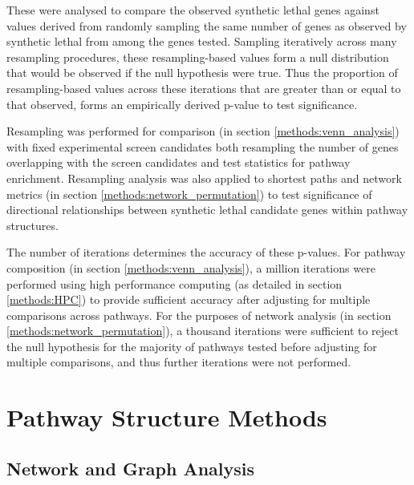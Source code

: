 These were analysed to compare the observed synthetic lethal genes against values derived from randomly sampling the same number of genes as observed by synthetic lethal from among the genes tested. Sampling iteratively across many resampling procedures, these resampling-based values form a null distribution that would be observed if the null hypothesis were true. Thus the proportion of resampling-based values across these iterations that are greater than or equal to that observed, forms an empirically derived p-value to test significance.

Resampling was performed for comparison (in section \ref{methods:venn_analysis}) with fixed experimental screen candidates \citep{Telford2015} both resampling the number of genes overlapping with the screen candidates and test statistics for pathway enrichment. Resampling analysis was also applied to shortest paths and network metrics (in section \ref{methods:network_permutation}) to test significance of directional relationships between synthetic lethal candidate genes within pathway structures.

The number of iterations determines the accuracy of these p-values. For pathway composition (in section \ref{methods:venn_analysis}), a million iterations were performed using high performance computing (as detailed in section \ref{methods:HPC}) to provide sufficient accuracy after adjusting for multiple comparisons across pathways. For the purposes of network analysis (in section \ref{methods:network_permutation}), a thousand iterations were sufficient to reject the null hypothesis for the majority of pathways tested before adjusting for multiple comparisons, and thus further iterations were not performed.

\section{Pathway Structure Methods}

\subsection{Network and Graph Analysis}

